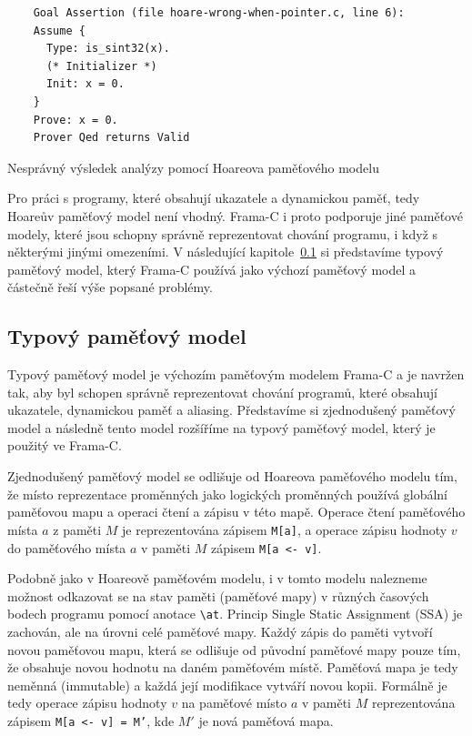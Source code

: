\begin{listing}[H]
    \begin{verbatim}
    Goal Assertion (file hoare-wrong-when-pointer.c, line 6):
    Assume {
      Type: is_sint32(x).
      (* Initializer *)
      Init: x = 0.
    }
    Prove: x = 0.
    Prover Qed returns Valid
    \end{verbatim}
    \caption{Nesprávný výsledek analýzy pomocí Hoareova paměťového modelu}
    \label{list:ssa-pointer-invalid-example-result}
\end{listing}

Pro práci s programy, které obsahují ukazatele a dynamickou paměť, tedy Hoareův paměťový model není vhodný.
Frama\mbox{-}C i proto podporuje jiné paměťové modely,
které jsou schopny správně reprezentovat chování programu, i když s některými jinými omezeními.
V následující kapitole~\ref{subsec:typovy-pametovy-model} si představíme typový paměťový model,
který Frama\mbox{-}C používá jako výchozí paměťový model a částečně řeší výše popsané problémy.

\subsection{Typový paměťový model}
\label{subsec:typovy-pametovy-model}


Typový paměťový model je výchozím paměťovým modelem Frama\mbox{-}C
a je navržen tak, aby byl schopen správně reprezentovat chování programů,
které obsahují ukazatele, dynamickou paměť a aliasing.
Představíme si zjednodušený paměťový model a následně tento model rozšíříme na typový paměťový model,
který je použitý ve Frama\mbox{-}C\@.


Zjednodušený paměťový model se odlišuje od Hoareova paměťového modelu tím,
že místo reprezentace proměnných jako logických proměnných
používá globální paměťovou mapu a operaci čtení a zápisu v této mapě.
Operace čtení paměťového místa $a$ z paměti $M$ je reprezentována zápisem \texttt{M[a]},
a operace zápisu hodnoty $v$ do paměťového místa $a$ v paměti $M$ zápisem \texttt{M[a <- v]}.


Podobně jako v Hoareově paměťovém modelu,
i v tomto modelu nalezneme možnost odkazovat se na stav paměti (paměťové mapy)
v různých časových bodech programu pomocí anotace \texttt{\textbackslash at}.
Princip Single Static Assignment (SSA) je zachován, ale na úrovni celé paměťové mapy.
Každý zápis do paměti vytvoří novou paměťovou mapu,
která se odlišuje od původní paměťové mapy pouze tím,
že obsahuje novou hodnotu na daném paměťovém místě.
Paměťová mapa je tedy neměnná (immutable) a každá její modifikace vytváří novou kopii.
Formálně je tedy operace zápisu hodnoty $v$ na paměťové místo $a$ v paměti $M$ reprezentována zápisem
\texttt{M[a <- v] = M'}, kde $M'$ je nová paměťová mapa.

